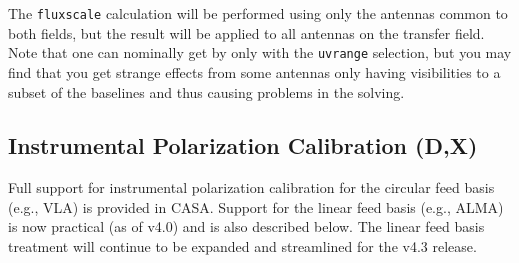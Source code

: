 The {\tt fluxscale} calculation will be performed using only the
antennas common 
to both fields, but the result will be applied to all antennas on the
transfer field.  Note that one can nominally get by only with the
{\tt uvrange} selection, but you may find that you get strange
effects from some antennas only having visibilities to a subset of
the baselines and thus causing problems in the solving.

\subsection{Instrumental Polarization Calibration (D,X)}
\label{section:cal.solve.pol}

Full support for instrumental polarization calibration for the 
circular feed basis (e.g., VLA) is provided in CASA.  Support for 
the linear feed basis (e.g., ALMA) is now practical (as of v4.0)
and is also described below.  The linear feed basis treatment
will continue to be expanded and streamlined for the v4.3 release.

